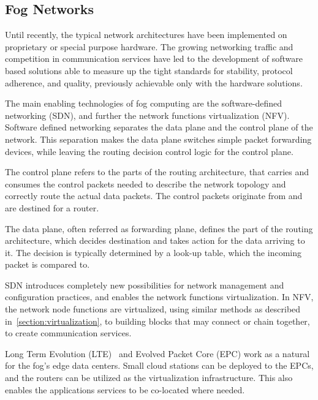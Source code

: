 \subsection{Fog Networks}
Until recently, the typical network architectures have been implemented on proprietary or special purpose hardware. The growing networking traffic and competition in communication services have led to the development of software based solutions able to measure up the tight standards for stability, protocol adherence, and quality, previously achievable only with the hardware solutions.~\cite{Kim:2013:SDN}

The main enabling technologies of fog computing are the software-defined networking (SDN), and further the network functions virtualization (NFV). Software defined networking separates the data plane and the control plane of the network. This separation makes the data plane switches simple packet forwarding devices, while leaving the routing decision control logic for the control plane.~\cite{Kim:2013:SDN, Demestichas:2013:NFV}

The control plane refers to the parts of the routing architecture, that carries and consumes the control packets needed to describe the network topology and correctly route the actual data packets. The control packets originate from and are destined for a router.~\cite{Chao:2007:HPS:1202844, Yang:2004:FCE:RFC3746}

The data plane, often referred as forwarding plane, defines the part of the routing architecture, which decides destination and takes action for the data arriving to it. The decision is typically determined by a look-up table, which the incoming packet is compared to.~\cite{Chao:2007:HPS:1202844, Yang:2004:FCE:RFC3746}

SDN introduces completely new possibilities for network management and configuration practices, and enables the network functions virtualization. In NFV, the network node functions are virtualized, using similar methods as described in~\ref{section:virtualization}, to building blocks that may connect or chain together, to create communication services.~\cite{Demestichas:2013:NFV}

Long Term Evolution (LTE)~\cite{Sesia:2009:LTE} and Evolved Packet Core (EPC) work as a natural for the fog's edge data centers. Small cloud stations can be deployed to the EPCs, and the routers can be utilized as the virtualization infrastructure. This also enables the applications services to be co-located where needed.~\cite{vaquero:2014:FYW}

